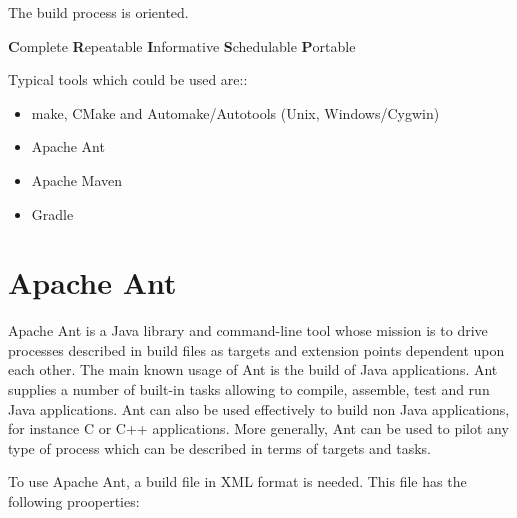 The build process is  oriented.


 {\bfseries C}omplete {\bfseries R}epeatable {\bfseries I}nformative {\bfseries S}chedulable {\bfseries P}ortable

Typical tools which could be used are::
\begin{itemize}
\item make, CMake and Automake/Autotools (Unix, Windows/Cygwin)
\item Apache Ant
\item Apache Maven
\item Gradle
\end{itemize}
%
\section{Apache Ant}
Apache Ant is a Java library and command-line tool whose mission
is to drive processes described in build files as targets and
extension points dependent upon each other. The main known usage
of Ant is the build of Java applications. Ant supplies a number of
built-in tasks allowing to compile, assemble, test and run Java
applications. Ant can also be used effectively to build non Java
applications, for instance C or C++ applications. More generally,
Ant can be used to pilot any type of process which can be described
in terms of targets and tasks.\\

\vspace{3mm}

To use Apache Ant, a build file in XML format is needed. This file
has the following prooperties:

